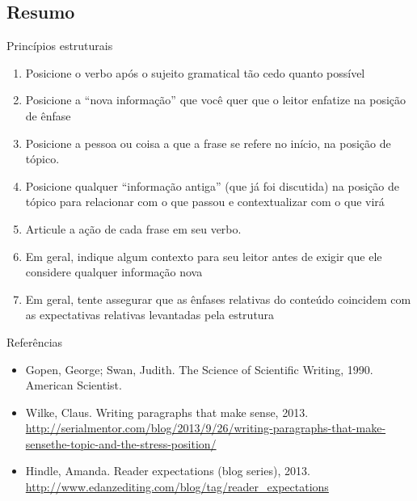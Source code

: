 \documentclass{beamer}
\begin{document}
\subsection{Resumo}

\begin{frame}{Princípios estruturais}

  \begin{enumerate}
  \item Posicione o verbo após o sujeito gramatical tão cedo quanto
    possível
  \item Posicione a ``nova informação'' que você quer que o leitor
    enfatize na posição de ênfase
  \item Posicione a pessoa ou coisa a que a frase se refere no início,
    na posição de tópico.
  \item Posicione qualquer ``informação antiga'' (que já foi
    discutida) na posição de tópico para relacionar com o que passou e
    contextualizar com o que virá
  \item Articule a ação de cada frase em seu verbo.
  \item Em geral, indique algum contexto para seu leitor antes de
    exigir que ele considere qualquer informação nova
  \item Em geral, tente assegurar que as ênfases relativas do conteúdo
    coincidem com as expectativas relativas levantadas pela estrutura
  \end{enumerate}
\end{frame}

\begin{frame}{Referências}
  \begin{itemize}
  \item<1-> Gopen, George; Swan, Judith. The Science of Scientific
    Writing, 1990. American Scientist.
  \item<1-> Wilke, Claus. Writing paragraphs that make sense,
    2013. \url{http://serialmentor.com/blog/2013/9/26/writing-paragraphs-that-make-sensethe-topic-and-the-stress-position/}
  \item<1-> Hindle, Amanda. Reader expectations (blog series),
    2013. \url{http://www.edanzediting.com/blog/tag/reader_expectations}
  \end{itemize}
\end{frame}
\end{document}
